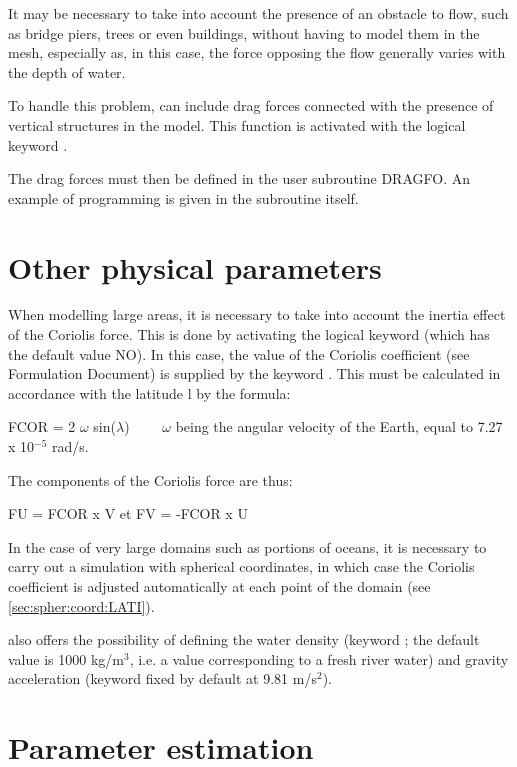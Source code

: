  It may be necessary to take into account the presence of an obstacle to flow, such as bridge piers, trees or even buildings, without having to model them in the mesh, especially as, in this case, the force opposing the flow generally varies with the depth of water.

 To handle this problem,  can include drag forces connected with the presence of vertical structures in the model. This function is activated with the logical keyword .

 The drag forces must then be defined in the user subroutine DRAGFO. An example of programming is given in the subroutine itself.


\section{Other physical parameters}

 When modelling large areas, it is necessary to take into account the inertia effect of the Coriolis force. This is done by activating the logical keyword   (which has the default value NO). In this case, the value of the Coriolis coefficient (see Formulation Document) is supplied by the keyword . This must be calculated in accordance with the latitude l by the formula:

 FCOR = 2 $\omega$ sin($\lambda$)          $\qquad \omega$ being the angular velocity of the Earth, equal to 7.27 x 10${}^{-5}$ rad/s.

 The components of the Coriolis force are thus:

 FU = FCOR x V         et         FV = -FCOR x U

 In the case of very large domains such as portions of oceans, it is necessary to carry out a simulation with spherical coordinates, in which case the Coriolis coefficient is adjusted automatically at each point of the domain (see \ref{sec:spher:coord:LATI}).

  also offers the possibility of defining the water density (keyword  ; the default value is 1000 kg/m${}^{3}$, i.e. a value corresponding to a fresh river water) and gravity acceleration (keyword   fixed by default at 9.81 m/s${}^{2}$).


\section{Parameter estimation }


